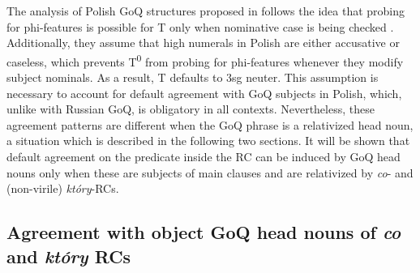 \documentclass[output=paper]{langsci/langscibook}
\begin{document}
The analysis of Polish GoQ structures proposed in \citet{Witkoś2016} follows the idea that probing for phi-features is possible for T only when nominative case is being checked \citep{Bošković2006}. Additionally, they assume that high numerals in Polish are either accusative or caseless, which prevents T\textsuperscript{0} from probing for phi-features whenever they modify subject nominals. As a result, T defaults to 3sg neuter. This assumption is necessary to account for default agreement with GoQ subjects in Polish, which, unlike with Russian GoQ, is obligatory in all contexts. Nevertheless, these agreement patterns are different when the GoQ phrase is a relativized head noun, a situation which is described in the following two sections. It will be shown that default agreement on the predicate inside the RC can be induced by GoQ head nouns only when these are subjects of main clauses and are relativized by \textit{co}{}- and (non-virile) \textit{który}{}-RCs.

\subsection{Agreement with object GoQ head nouns of \textit{co} and \textit{który} RCs}%
 
\end{document}

